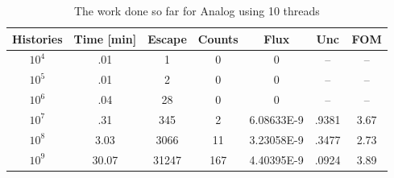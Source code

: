 \documentclass{article}
\begin{document}
\begin{table}
\begin{center}
\label{tbl_decay}
\caption{The work done so far for Analog using 10 threads}
\begin{tabular}{|c|c|c|c|c|c|c|}
\hline
\textbf{Histories} & \textbf{Time [min]} & \textbf{Escape} & \textbf{Counts} & \textbf{Flux} & \textbf{Unc} & \textbf{FOM} \\ \hline
$10^4$ & .01 & 1 & 0 & 0 & -- & -- \\ \hline
$10^5$ & .01 & 2 & 0 & 0 & -- & -- \\ \hline
$10^6$ & .04 & 28 & 0 & 0 & -- & -- \\ \hline
$10^7$ & .31 & 345 & 2 & 6.08633E-9 & .9381 & 3.67 \\ \hline
$10^8$ & 3.03 & 3066 & 11 & 3.23058E-9 & .3477 & 2.73 \\ \hline
$10^9$ & 30.07 & 31247 & 167 & 4.40395E-9 & .0924 & 3.89 \\ \hline
\end{tabular}
\end{center}
\end{table}
\end{document}
